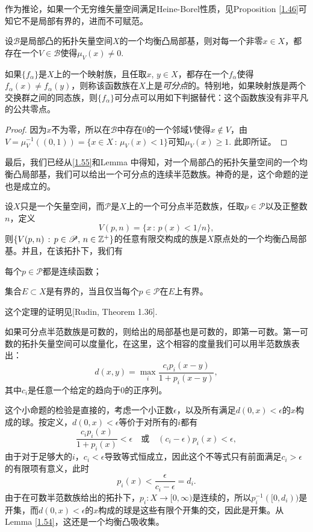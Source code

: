 作为推论，如果一个无穷维矢量空间满足Heine-Borel性质，见Proposition \ref{1.46}可知它不是局部有界的，进而不可赋范。

\begin{lem}
设$\mathscr{B}$是局部凸的拓扑矢量空间$X$的一个均衡凸局部基，则对每一个非零$x\in X$，都存在一个$V\in \mathscr{B}$使得$\mu_V(x)\neq 0$.
\end{lem}

如果$\{f_\alpha\}$是$X$上的一个映射族，且任取$x$, $y\in X$，都存在一个$f_\alpha$使得$f_\alpha(x)\neq f_\alpha(y)$，则称该函数族在$X$上是\textit{可分点}的。特别地，如果映射族是两个交换群之间的同态族，则$\{f_\alpha\}$可分点可以用如下判据替代：这个函数族没有非平凡的公共零点。

\begin{proof}
	因为$x$不为零，所以在$\mathscr{B}$中存在$0$的一个邻域$V$使得$x\not\in V$，由$V=\mu_V^{-1}((0,1))=\{x\in X\,:\, \mu_V(x)<1\}$可知$\mu_V(x)\geq 1$. 此即所证。
\end{proof}

最后，我们已经从\ref{1.55}和Lemma \thelem 中得知，对一个局部凸的拓扑矢量空间的一个均衡凸局部基，我们可以给出一个可分点的连续半范数族。神奇的是，这个命题的逆也是成立的。

\begin{thm}\label{1.61}
设$X$只是一个矢量空间，而$\mathscr{P}$是$X$上的一个可分点半范数族，任取$p\in\mathscr{P}$以及正整数$n$，定义
\[
	V(p,n)=\{x\,:\, p(x)<1/n\},
\]
则$\{V(p,n)\,:\, p\in\mathscr{P},\, n\in \mathbb{Z}^+\}$的任意有限交构成的族是$X$原点处的一个均衡凸局部基。并且，在该拓扑下，我们有
\begin{compactenum}[(a)]
\item 每个$p\in \mathscr{P}$都是连续函数；
\item 集合$E\subset X$是有界的，当且仅当每个$p\in \mathscr{P}$在$E$上有界。
\end{compactenum}
\end{thm}

这个定理的证明见[Rudin, Theorem 1.36].

如果可分点半范数族是可数的，则给出的局部基也是可数的，即第一可数。第一可数的拓扑矢量空间可以度量化，在这里，这个相容的度量我们可以用半范数族表出：
\[
	d(x,y)=\max_i \frac{c_i p_i(x-y)}{1+p_i(x-y)},
\]
其中$c_i$是任意一个给定的趋向于$0$的正序列。

这个小命题的检验是直接的，考虑一个小正数$\epsilon$，以及所有满足$d(0,x)<\epsilon$的$x$构成的球。按定义，$d(0,x)<\epsilon$等价于对所有的$i$都有
\[
	\frac{c_i p_i(x)}{1+p_i(x)}<\epsilon\quad\text{或}\quad (c_i-\epsilon)p_i(x)<\epsilon,
\]
由于对于足够大的$i$，$c_i<\epsilon$导致等式恒成立，因此这个不等式只有前面满足$c_i>\epsilon$的有限项有意义，此时
\[
	p_i(x)<\frac{\epsilon}{c_i-\epsilon}=d_i.
\]
由于在可数半范数族给出的拓扑下，$p_i:X\to [0,\infty)$是连续的，所以$p_i^{-1}([0,d_i))$是开集，而$d(0,x)<\epsilon$的$x$构成的球是这些有限个开集的交，因此是开集。从Lemma \ref{1.54}，这还是一个均衡凸吸收集。

